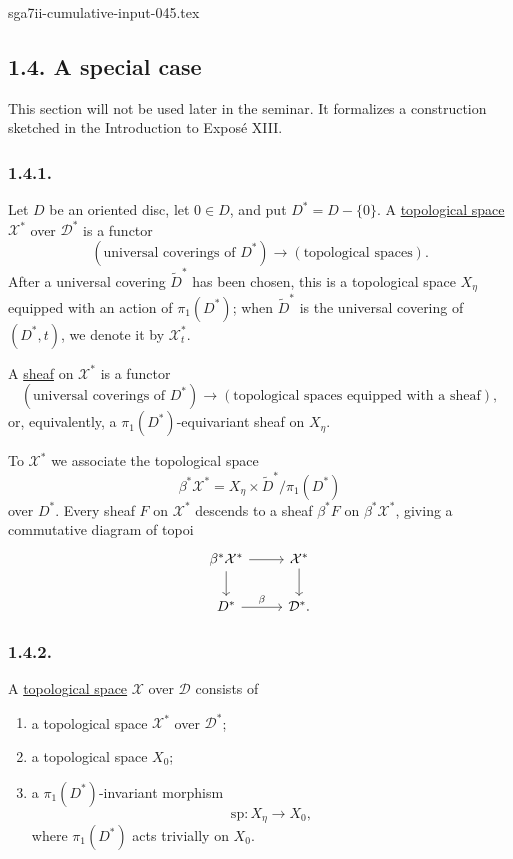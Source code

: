\begin{filecontents*}{sga7ii-cumulative-input-045.tex}
\subsection*{1.4. A special case}

This section will not be used later in the seminar.  It formalizes a
construction sketched in the Introduction to Expos\'e XIII.

\subsubsection*{1.4.1.}
Let $D$ be an oriented disc, let $0\in D$, and put
$D^*=D-\{0\}$.  A \underline{topological space} $\mathcal X^*$ over
$\mathcal D^*$ is a functor
\[
(\text{universal coverings of }D^*)
\longrightarrow(\text{topological spaces}).
\]
After a universal covering $\widetilde D^*$ has been chosen, this is
a topological space $X_\eta$ equipped with an action of
$\pi_1(D^*)$; when $\widetilde D^*$ is the universal covering of
$(D^*,t)$, we denote it by $\mathcal X_t^*$.

A \underline{sheaf} on $\mathcal X^*$ is a functor
\[
(\text{universal coverings of }D^*)
\longrightarrow
(\text{topological spaces equipped with a sheaf}),
\]
or, equivalently, a $\pi_1(D^*)$-equivariant sheaf on $X_\eta$.

To $\mathcal X^*$ we associate the topological space
\[
\beta^*\mathcal X^*
=X_\eta\times\widetilde D^*/\pi_1(D^*)
\]
over $D^*$.  Every sheaf $F$ on $\mathcal X^*$ descends to a sheaf
$\beta^*F$ on $\beta^*\mathcal X^*$, giving a commutative diagram of
topoi
\[
\begin{tikzcd}
\beta^*\mathcal X^* \arrow[r] \arrow[d]
  & \mathcal X^* \arrow[d] \\
D^* \arrow[r, "\beta"]
  & \mathcal D^*.
\end{tikzcd}
\]

\subsubsection*{1.4.2.}
A \underline{topological space} $\mathcal X$ over $\mathcal D$
consists of
\begin{enumerate}[label=(\alph*),leftmargin=2.7em]
\item a topological space $\mathcal X^*$ over $\mathcal D^*$;
\item a topological space $X_0$;
\item a $\pi_1(D^*)$-invariant morphism
\[
\mathrm{sp}:X_\eta\longrightarrow X_0,
\]
where $\pi_1(D^*)$ acts trivially on $X_0$.
\end{enumerate}


\end{filecontents*}
